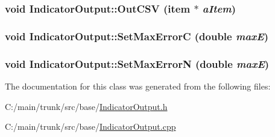 \label{class_indicator_output_a580f364c5b0f365955f47a44fac302e3}
\hypertarget{class_indicator_output_a72be7008e52ebb04fedbffad9b75ae74}{
\subsubsection[{OutCSV}]{\setlength{\rightskip}{0pt plus 5cm}void IndicatorOutput::OutCSV ({\bf item} $\ast$ {\em aItem})}}
\label{class_indicator_output_a72be7008e52ebb04fedbffad9b75ae74}
\hypertarget{class_indicator_output_a1269716d2ca0c1a260e033dfda4a1b7e}{
\subsubsection[{SetMaxErrorC}]{\setlength{\rightskip}{0pt plus 5cm}void IndicatorOutput::SetMaxErrorC (double {\em maxE})}}
\label{class_indicator_output_a1269716d2ca0c1a260e033dfda4a1b7e}
\hypertarget{class_indicator_output_aa849c5243c889dd83b0f07e8bc72b4da}{
\subsubsection[{SetMaxErrorN}]{\setlength{\rightskip}{0pt plus 5cm}void IndicatorOutput::SetMaxErrorN (double {\em maxE})}}
\label{class_indicator_output_aa849c5243c889dd83b0f07e8bc72b4da}


The documentation for this class was generated from the following files:\begin{DoxyCompactItemize}
\item 
C:/main/trunk/src/base/\hyperlink{_indicator_output_8h}{IndicatorOutput.h}\item 
C:/main/trunk/src/base/\hyperlink{_indicator_output_8cpp}{IndicatorOutput.cpp}\end{DoxyCompactItemize}
